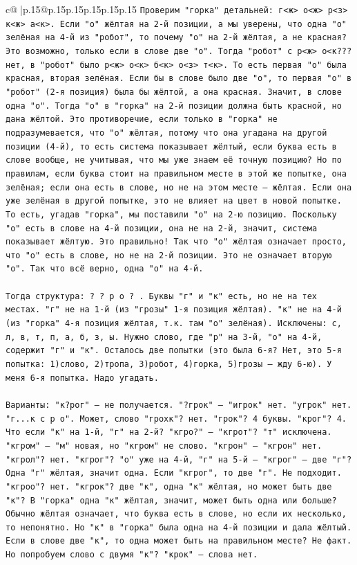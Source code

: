 \documentclass{article}
\begin{document}
{\begin{supertabular}{c@{$\;$}|p{.15\linewidth}@{}p{.15\linewidth}p{.15\linewidth}p{.15\linewidth}p{.15\linewidth}p{.15\linewidth}}
{{{\texttt{Проверим "горка" детальней: г<ж> о<ж> р<з> к<ж> а<к>. Если "о" жёлтая на 2{-}й позиции, а мы уверены, что одна "о" зелёная на 4{-}й из "робот", то почему "о" на 2{-}й жёлтая, а не красная? Это возможно, только если в слове две "о". Тогда "робот" с р<ж> о<к??? нет, в "робот" было р<ж> о<к> б<к> о<з> т<к>. То есть первая "о" была красная, вторая зелёная. Если бы в слове было две "о", то первая "о" в "робот" (2{-}я позиция) была бы жёлтой, а она красная. Значит, в слове одна "о". Тогда "о" в "горка" на 2{-}й позиции должна быть красной, но дана жёлтой. Это противоречие, если только в "горка" не подразумевается, что "о" жёлтая, потому что она угадана на другой позиции (4{-}й), то есть система показывает жёлтый, если буква есть в слове вообще, не учитывая, что мы уже знаем её точную позицию? Но по правилам, если буква стоит на правильном месте в этой же попытке, она зелёная; если она есть в слове, но не на этом месте — жёлтая. Если она уже зелёная в другой попытке, это не влияет на цвет в новой попытке. То есть, угадав "горка", мы поставили "о" на 2{-}ю позицию. Поскольку "о" есть в слове на 4{-}й позиции, она не на 2{-}й, значит, система показывает жёлтую. Это правильно! Так что "о" жёлтая означает просто, что "о" есть в слове, но не на 2{-}й позиции. Это не означает вторую "о". Так что всё верно, одна "о" на 4{-}й.} \\
\\ 
\texttt{Тогда структура: ? ? р о ? . Буквы "г" и "к" есть, но не на тех местах. "г" не на 1{-}й (из "грозы" 1{-}я позиция жёлтая). "к" не на 4{-}й (из "горка" 4{-}я позиция жёлтая, т.к. там "о" зелёная). Исключены: с, л, в, т, п, а, б, з, ы. Нужно слово, где "р" на 3{-}й, "о" на 4{-}й, содержит "г" и "к". Осталось две попытки (это была 6{-}я? Нет, это 5{-}я попытка: 1)слово, 2)тропа, 3)робот, 4)горка, 5)грозы — жду 6{-}ю). У меня 6{-}я попытка. Надо угадать.} \\
\\ 
\texttt{Варианты: "к?рог" — не получается. "?грок" — "игрок" нет. "угрок" нет. "г...к с р о". Может, слово "грохк"? нет. "грок"? 4 буквы. "крог"? 4. Что если "к" на 1{-}й, "г" на 2{-}й? "кгро?" — "кгрот"? "т" исключена. "кгром" — "м" новая, но "кгром" не слово. "кгрон" — "кгрон" нет. "кгрол"? нет. "кгрог"? "о" уже на 4{-}й, "г" на 5{-}й — "кгрог" — две "г"? Одна "г" жёлтая, значит одна. Если "кгрог", то две "г". Не подходит. "кгроо"? нет. "кгрок"? две "к", одна "к" жёлтая, но может быть две "к"? В "горка" одна "к" жёлтая, значит, может быть одна или больше? Обычно жёлтая означает, что буква есть в слове, но если их несколько, то непонятно. Но "к" в "горка" была одна на 4{-}й позиции и дала жёлтый. Если в слове две "к", то одна может быть на правильном месте? Не факт. Но попробуем слово с двумя "к"? "крок" — слова нет.} \\
}}}
\end{supertabular}}
\end{document}
